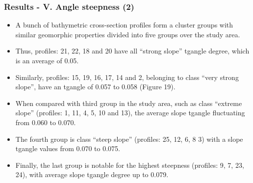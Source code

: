 \documentclass[pdflatex,compress,10pt,
	xcolor={dvipsnames,dvipsnames,svgnames,x11names,table},
	hyperref={colorlinks = true,breaklinks = true, urlcolor = NavyBlue, breaklinks = true}]{beamer}
\begin{document}
\begin{frame}\frametitle{Results - V. Angle steepness (2)}	

	\begin{itemize}
		 \item A bunch of bathymetric cross-section profiles form a cluster groups with similar geomorphic properties divided into five groups over the study area. 
		 \item Thus, profiles: 21, 22, 18 and 20 have all “strong slope” tg\degree angle degree, which is an average of 0.05. 
		 \item Similarly, profiles: 15, 19, 16, 17, 14 and 2, belonging to class “very strong slope”, have an tg\degree angle of 0.057 to 0.058 (Figure 19). 
		 \item When compared with third group in the study area, such as class “extreme slope” (profiles: 1, 11, 4, 5, 10 and 13), the average slope tg\degree angle fluctuating from 0.060 to 0.070. 
		 \item The fourth group is class “steep slope” (profiles: 25, 12, 6, 8 3) with a slope tg\degree angle values from 0.070 to 0.075. 
		 \item Finally, the last group is notable for the highest steepness (profiles: 9, 7, 23, 24), with average slope tg\degree angle degree up to 0.079. 
	\end{itemize}		 
\end{frame}


\end{document}
